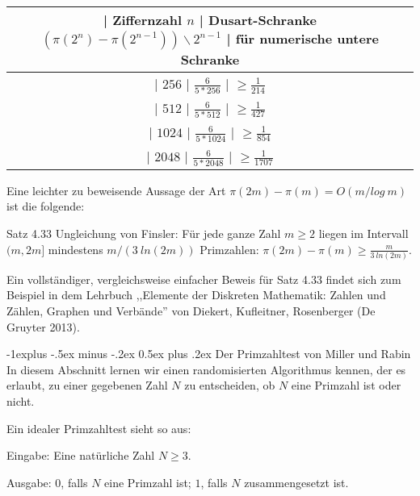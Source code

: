 \documentclass[a4paper]{article}
\makeatletter
\renewcommand{\subsection}{\@startsection{subsection}{2}{0mm}%
 {-1explus -.5ex minus -.2ex}%
 {0.5ex plus .2ex}%
 {\normalfont\normalsize\bfseries}}
\makeatother
\begin{document}
\begin{multicols}{3}
        \begin{tabular}{c}
            | Ziffernzahl $n$ | Dusart-Schranke $(\pi(2^n)-\pi(2^{n-1}))\backslash 2^{n-1}$ | für numerische untere Schranke \\\hline
            | $256$      | $\frac{6}{5*256}$                      | $\geq \frac{1}{214}$                                     \\
            | $512$      | $\frac{6}{5*512}$                      | $\geq \frac{1}{427}$                                     \\
            | $1024$     | $\frac{6}{5*1024}$                     | $\geq\frac{1}{854}$                                      \\
            | $2048$     | $\frac{6}{5*2048}$                     | $\geq\frac{1}{1707}$
        \end{tabular}

        Eine leichter zu beweisende Aussage der Art $\pi(2m)-\pi(m) = O(m/log\ m)$ ist die folgende:

        Satz 4.33 Ungleichung von Finsler: Für jede ganze Zahl $m\geq 2$ liegen im Intervall $(m, 2m]$ mindestens $m/(3\ ln(2m))$ Primzahlen: $\pi (2m)-\pi(m)\geq \frac{m}{3\ ln(2m)}$.

        Ein vollständiger, vergleichsweise einfacher Beweis für Satz 4.33 findet sich zum Beispiel in dem Lehrbuch ,,Elemente der Diskreten Mathematik: Zahlen und Zählen, Graphen und Verbände'' von Diekert, Kufleitner, Rosenberger (De Gruyter 2013).

        \subsection{Der Primzahltest von Miller und Rabin}
        In diesem Abschnitt lernen wir einen randomisierten Algorithmus kennen, der es erlaubt, zu einer gegebenen Zahl $N$ zu entscheiden, ob $N$ eine Primzahl ist oder nicht.

        Ein idealer Primzahltest sieht so aus:
        \begin{itemize*}
            \item Eingabe: Eine natürliche Zahl $N\geq 3$.
            \item Ausgabe: $0$, falls $N$ eine Primzahl ist; $1$, falls $N$ zusammengesetzt ist.
        \end{itemize*}


\end{multicols}
\end{document}
